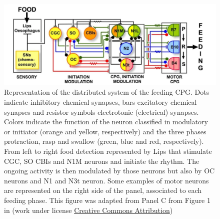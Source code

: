 \begin{figure}[bth!]
	\centering
	\includegraphics[width=\textwidth]{img/invariants/distributed_benjamin_2012.pdf}
	\caption{Representation of the distributed system of the feeding CPG. Dots indicate inhibitory chemical synapses, bars excitatory chemical synapses and resistor symbols electrotonic (electrical) synapses. Colors indicate the function of the neuron classified in modulatory or initiator (orange and yellow, respectively) and the three phases protraction, rasp and swallow (green, blue and red, respectively). From left to right food detection represented by Lips that stimulate CGC, SO CBIs and N1M neurons and initiate the rhythm. The ongoing activity is then modulated by those neurons but also by OC neurons and N1 and N3t neuron. Some examples of motor neurons are represented on the right side of the panel, associated to each feeding phase. This figure was adapted from Panel C from Figure 1 in \cite{benjamin_distributed_2012} (work under license \href{http://creativecommons.org/licenses/by/2.0}{Creative Commons Attribution})}
	\label{fig:feeding distribution}%
\end{figure}



